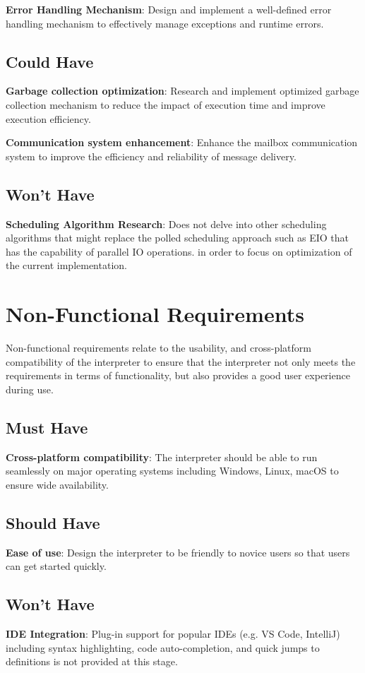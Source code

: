 \documentclass{l4proj}
\begin{document}
\textbf{Error Handling Mechanism}: Design and implement a well-defined error handling mechanism to effectively manage exceptions and runtime errors.

\subsection{Could Have}
\textbf{Garbage collection optimization}: Research and implement optimized garbage collection mechanism to reduce the impact of execution time and improve execution efficiency.

\textbf{Communication system enhancement}: Enhance the mailbox communication system to improve the efficiency and reliability of message delivery.

\subsection{Won't Have}
\textbf{Scheduling Algorithm Research}: Does not delve into other scheduling algorithms that might replace the polled scheduling approach such as EIO that has the capability of parallel IO operations. in order to focus on optimization of the current implementation.

\section{Non-Functional Requirements}
Non-functional requirements relate to the usability, and cross-platform compatibility of the interpreter to ensure that the interpreter not only meets the requirements in terms of functionality, but also provides a good user experience during use.

\subsection{Must Have}
\textbf{Cross-platform compatibility}: The interpreter should be able to run seamlessly on major operating systems including Windows, Linux, macOS to ensure wide availability.

\subsection{Should Have}
\textbf{Ease of use}: Design the interpreter to be friendly to novice users so that users can get started quickly.

\subsection{Won't Have}
\textbf{IDE Integration}: Plug-in support for popular IDEs (e.g. VS Code, IntelliJ) including syntax highlighting, code auto-completion, and quick jumps to definitions is not provided at this stage.
\end{document}
